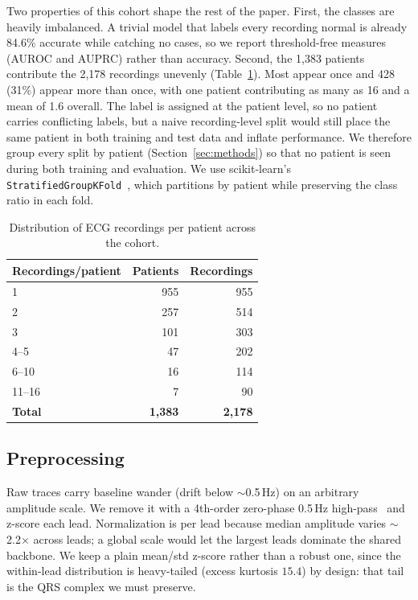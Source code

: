 \documentclass[sigconf,nonacm]{acmart}
\begin{document}
Two properties of this cohort shape the rest of the paper. First, the classes
are heavily imbalanced. A trivial model that labels every recording normal is
already 84.6\% accurate while catching no cases, so we report threshold-free
measures (AUROC and AUPRC) rather than accuracy. Second, the 1,383 patients
contribute the 2,178 recordings unevenly (Table~\ref{tab:perpatient}). Most
appear once and 428 (31\%) appear more than once, with one patient
contributing as many as 16 and a mean of 1.6 overall. The label is assigned at
the patient level, so no patient carries conflicting labels, but a naive
recording-level split would still place the same patient in both training and
test data and inflate performance. We therefore group every split by patient
(Section~\ref{sec:methods}) so that no patient is seen during both training and
evaluation. We use scikit-learn's \texttt{StratifiedGroupKFold}~\cite{pedregosa_scikit-learn_2011}, which
partitions by patient while preserving the class ratio in each fold.

\begin{table}[H]
\centering
\caption{Distribution of ECG recordings per patient across the cohort.}
\label{tab:perpatient}
\small
\begin{tabular}{@{}lrr@{}}
\toprule
\textbf{Recordings/patient} & \textbf{Patients} & \textbf{Recordings} \\
\midrule
1 & 955 & 955 \\
2 & 257 & 514 \\
3 & 101 & 303 \\
4--5 & 47 & 202 \\
6--10 & 16 & 114 \\
11--16 & 7 & 90 \\
\midrule
\textbf{Total} & \textbf{1{,}383} & \textbf{2{,}178} \\
\bottomrule
\end{tabular}
\end{table}

\subsection{Preprocessing}
\label{sec:preproc}

Raw traces carry baseline wander (drift below $\sim$0.5\,Hz) on an arbitrary
amplitude scale. We remove it with a 4th-order zero-phase 0.5\,Hz high-pass~\cite{jia_preprocessing_2024, adam_comparative_2025}
and z-score each lead. Normalization is per lead because median amplitude
varies $\sim$2.2$\times$ across leads; a global scale would let the largest
leads dominate the shared backbone. We keep a plain mean/std z-score rather
than a robust one, since the within-lead distribution is heavy-tailed
(excess kurtosis $15.4$) by design: that tail is the QRS complex we must
preserve.
\end{document}
